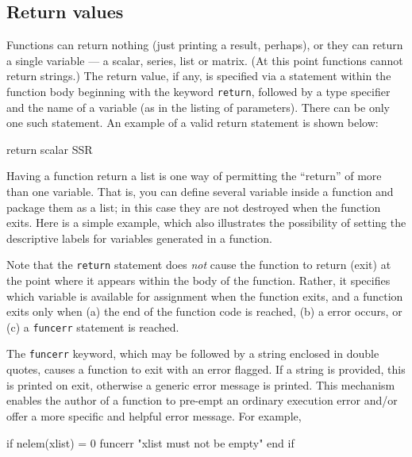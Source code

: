 \subsection{Return values}

Functions can return nothing (just printing a result, perhaps), or
they can return a single variable --- a scalar, series, list or
matrix.  (At this point functions cannot return strings.)
The return value, if any, is specified via a statement within the
function body beginning with the keyword \verb+return+, followed by a
type specifier and the name of a variable (as in the listing of
parameters).  There can be only one such statement.  An example of a
valid return statement is shown below:
%    
\begin{code}
return scalar SSR
\end{code}
%
Having a function return a list is one way of permitting the
``return'' of more than one variable.  That is, you can define several
variable inside a function and package them as a list; in this case
they are not destroyed when the function exits.  Here is a simple
example, which also illustrates the possibility of setting the
descriptive labels for variables generated in a function.
%    
%

Note that the \verb+return+ statement does \emph{not} cause the
function to return (exit) at the point where it appears within the
body of the function. Rather, it specifies which variable is available
for assignment when the function exits, and a function exits only when
(a) the end of the function code is reached, (b) a  error
occurs, or (c) a \verb+funcerr+ statement is reached.

The \verb+funcerr+ keyword, which may be followed by a string enclosed
in double quotes, causes a function to exit with an error flagged.  If
a string is provided, this is printed on exit, otherwise a generic
error message is printed.  This mechanism enables the author of a
function to pre-empt an ordinary execution error and/or offer a more
specific and helpful error message.  For example,
%
\begin{code}
if nelem(xlist) = 0
   funcerr "xlist must not be empty"
end if
\end{code}
    

